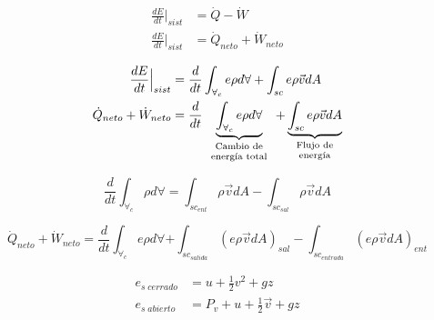 \[
    \begin{split}
        \frac{ dE }{ dt }\Big|_{sist} & = \dot{Q} - \dot{W} \\
        \frac{ dE }{ dt }\Big|_{sist} & = \dot{Q}_{neto} + \dot{W}_{neto}
    \end{split}
\]

\[
    \begin{split}
        \frac{ dE }{ dt }\Big|_{sist} & = \frac{ d }{ dt } \int_{ \forall_{c} } e\rho d\forall + \int_{sc} e \rho \Vec{v} dA \\
        \dot{Q}_{neto} + \dot{W}_{neto} & = \frac{ d }{ dt } \underbrace{ \int_{\forall_{c}} e \rho d\forall }_{
            \begin{scriptsize}
                    \begin{array}{cc}
                        \text{Cambio de} \\
                         \text{energía total}
                    \end{array}
            \end{scriptsize} } + 
        \underbrace{ \int_{sc} e \rho \Vec{v} dA }_{
            \begin{scriptsize}
                    \begin{array}{cc}
                        \text{Flujo de} \\
                         \text{energía}
                    \end{array}
            \end{scriptsize} }
    \end{split}
\]

\[
    \frac{ d }{ dt } \int_{ \forall_{c} } \rho d \forall = \int_{sc_{ent}} \rho \Vec{v} dA - \int_{sc_{sal}} \rho \Vec{v} dA
\]

\[
    \dot{Q}_{neto} + \dot{W}_{neto} = \frac{ d }{ dt } \int_{ \forall_{c} } e \rho d\forall + \int_{sc_{salida}} (e \rho \Vec{v} dA)_{sal} - \int_{sc_{entrada}} (e \rho \Vec{v} dA)_{ent}
\]

\[
    \begin{split}
        e_{s \; cerrado} & = u + \frac{ 1 }{ 2 } v^{2} + gz \\
        e_{s \; abierto} & = P_{v} + u + \frac{ 1 }{ 2 } \Vec{v} + gz
    \end{split}
\]

